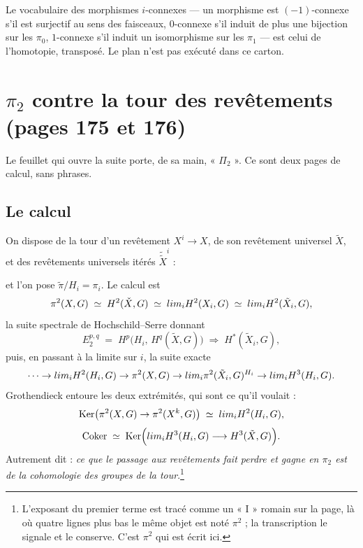 \documentclass[11pt,a4paper]{article}
\begin{document}
Le vocabulaire des morphismes $i$-connexes --- un morphisme est $(-1)$-connexe
s'il est surjectif au sens des faisceaux, $0$-connexe s'il induit de plus une
bijection sur les $\pi_{0}$, $1$-connexe s'il induit un isomorphisme sur les
$\pi_{1}$ --- est celui de l'homotopie, transposé. Le plan n'est pas exécuté
dans ce carton.

\section*{$\pi_{2}$ contre la tour des revêtements (pages 175 et 176)}

Le feuillet qui ouvre la suite porte, de sa main, « $\Pi_{2}$ ». Ce sont deux
pages de calcul, sans phrases.

\subsection*{Le calcul}

On dispose de la tour d'un revêtement $X^{i} \to X$, de son revêtement
universel $\tilde{X}$, et des revêtements universels itérés
$\tilde{\tilde{X}}^{i}$ :


et l'on pose $\tilde{\pi}/H_{i} = \pi_{i}$. Le calcul est
\[
  \pi^{2}(X, G) \;\simeq\; H^{2}(\check{X}, G) \;\simeq\;
  \varinjlim_{i} H^{2}(X_{i}, G) \;\simeq\;
  \varinjlim_{i} H^{2}(\tilde{X}_{i}, G) ,
\]
la suite spectrale de Hochschild--Serre donnant
\[
  E_{2}^{p,q} \;=\; H^{p}\bigl(H_{i},\, H^{q}(\tilde{X}, G)\bigr)
  \;\Longrightarrow\; H^{*}(\tilde{X}_{i}, G) ,
\]
puis, en passant à la limite sur $i$, la suite exacte
\[
  \cdots \to \varinjlim_{i} H^{2}(H_{i}, G) \to \pi^{2}(X, G) \to
  \varinjlim_{i} \pi^{2}(\tilde{X}_{i}, G)^{H_{i}} \to
  \varinjlim_{i} H^{3}(H_{i}, G) .
\]
Grothendieck entoure les deux extrémités, qui sont ce qu'il voulait :
\[
  \operatorname{Ker}\bigl(\pi^{2}(X,G) \to \pi^{2}(X^{k},G)\bigr) \;\simeq\;
  \varinjlim_{i} H^{2}(H_{i}, G) ,
\]
\[
  \operatorname{Coker} \;\simeq\;
  \operatorname{Ker}\Bigl(\varinjlim_{i} H^{3}(H_{i}, G) \longrightarrow
  H^{3}(\tilde{X}, G)\Bigr) .
\]
Autrement dit : \emph{ce que le passage aux revêtements fait perdre et gagne en
$\pi_{2}$ est de la cohomologie des groupes de la tour}.\footnote{L'exposant du
premier terme est tracé comme un « I » romain sur la page, là où quatre lignes
plus bas le même objet est noté $\pi^{2}$ ; la transcription le signale et le
conserve. C'est $\pi^{2}$ qui est écrit ici.}
\end{document}
